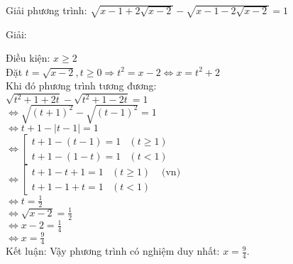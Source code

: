 \begin{vd}
  Giải phương trình: $ \sqrt{x-1+2\sqrt{x-2}} -\sqrt{x-1-2\sqrt{x-2}}=1 $
\end{vd}
\begin{center}
    Giải:
\end{center}

Điều kiện: $ x\geq 2 $ \\
Đặt $ t=\sqrt{x-2}, t\geq 0 \Rightarrow t^2 = x -2 \Leftrightarrow x =t^2 +2 $ \\
Khi đó phương trình tương đương: \\
$ \sqrt{t^2 + 1 +2t} - \sqrt{t^2 +1 -2t } =1 $ \\
$ \Leftrightarrow 
    \sqrt{(t+1)^2} - \sqrt{(t-1)^2} = 1 $ \\
$ \Leftrightarrow 
    t+1 - | t-1 | = 1 $ \\
$ \Leftrightarrow 
    \left[
        \begin{array}{lr}
            t+1 - (t -1) =1 & \left( t \geq 1\right) \\
            t +1 - (1-t) =1 & \left( t < 1 \right) 
        \end{array}
    \right.
$ \\
$ \Leftrightarrow 
    \left[ 
        \begin{array}{lrl}
            t+1-t+1=1 & \left( t\geq 1 \right) & \text{ (vn) }\\
            t+1 -1 +t =1 & \left( t<1 \right) &
        \end{array}
        \right.
$\\
$ \Leftrightarrow 
    t = \frac{1}{2} $ \\
$ \Leftrightarrow 
    \sqrt{x-2} = \frac{1}{2}
$\\
$ \Leftrightarrow x-2 = \frac{1}{4} $\\
$ \Leftrightarrow  x = \frac{9}{4}$\\
Kết luận: Vậy phương trình có nghiệm duy nhất: $ x=\frac{9}{4} $.
